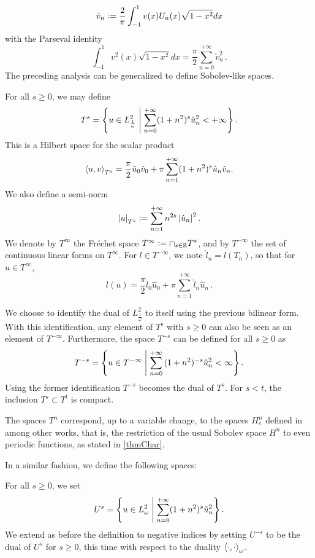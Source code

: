 \documentclass[a4paper]{article}
\begin{document}
\[ \check{v}_n \mathrel{\mathop:}= 
\dfrac{2}{\pi}\displaystyle\int_{-1}^{1} v(x) U_n(x)\sqrt{1-x^2}dx  \]
with the Parseval identity
\[ \int_{-1}^{1} v^2(x)\sqrt{1-x^2} dx =  \frac{\pi}{2} \sum_{n=0}^{+\infty}\check{v}_n^2\,.\]
The preceding analysis can be generalized to define Sobolev-like spaces. 
\begin{Def}
	For all $s \geq 0$, we may define 
	\[T^s = \left\{ u \in L^2_\frac{1}{\omega}\mathrel{}\middle|\mathrel{} \sum_{n=0}^{+\infty}(1+n^2)^s \hat{u}_n^2 < + \infty\right\}.\]
	This is a Hilbert space for the scalar product
	\[\left\langle u,v\right\rangle_{T^s} = \frac{\pi}{2}\hat{u}_0 \hat{v}_0 + \pi\sum_{n=1}^{+\infty}(1+n^2)^s\hat{u}_n \hat{v}_n.\]
	We also define a semi-norm 
	\[\left\lvert u \right\rvert_{T^s} \mathrel{\mathop:}= \sum_{n = 1}^{+ \infty}n^{2s} \left\lvert \hat{u}_n \right\rvert^2.\]
	We denote by $T^{\infty}$ the Fr\'echet space $T^{\infty} \mathrel{\mathop:}= \displaystyle\cap_{s \in \mathbb{R}} T^s$, and by $T^{-\infty}$ the set of continuous linear forms on $T^{\infty}$. For $l \in T^{-\infty}$, we note $\hat{l}_n = l(T_n)$, so that for $u \in T^{\infty}$, 
	\[l(u) = \frac{\pi}{2}\hat{l}_0 \hat{u}_0 + \pi \sum_{n=1}^{+\infty} \hat{l}_n \hat{u}_n\,.\] 
	
	We choose to identify the dual of $L^2_\frac{1}{\omega}$ to itself using the previous bilinear form.  With this identification, any element of $T^s$ with $s \geq 0$ can also be seen as an element of $T^{-\infty}$.  
	Furthermore, the space $T^{-s}$ can be defined for all $s \geq 0$ as
	\[T^{-s} = \left\{ u \in T^{-\infty}\mathrel{}\middle|\mathrel{} \sum_{n=0}^{+\infty}{(1 + n^2)^{-s} \hat{u}_n^2} < \infty\right\}.\]
	Using the former identification $T^{-s}$ becomes the dual of $T^s$. 
	For $s < t$, the inclusion $T^s \subset T^t$ is compact.
\end{Def}
\begin{Rem}
	The spaces $T^n$ correspond, up to a variable change, to the spaces $H^n_e$ defined in \cite{bruno2012second,atkinson1991numerical,yan1988integral,yan1990cosine} among other works, that is, the restriction of the usual Sobolev space $H^n$ to even periodic functions, as stated in \autoref{thmChar}. 
\end{Rem}
\noindent In a similar fashion, we define the following spaces:
\begin{Def}
	For all $s \geq 0$, we set
	\[U^s = \left\{u \in L^2_\omega\mathrel{}\middle|\mathrel{} \sum_{n=0}^{+\infty} (1 + n^2)^s\check{u}_n^2\right\}.\]
	We extend as before the definition to negative indices by setting $U^{-s}$ to be the dual of $U^s$ for $s\geq 0$, this time with respect to the duality $\left\langle \cdot,\cdot\right\rangle_\omega$. 
\end{Def}
\end{document}
